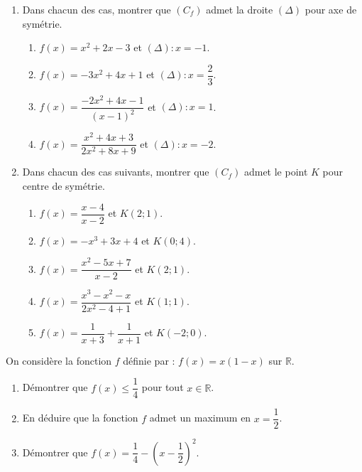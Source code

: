 \documentclass[12pt]{article}
\begin{document}
\begin{enumerate}
    \item  Dans chacun des cas, montrer que \( (C_f) \) admet la droite \( (\Delta) \) pour axe de symétrie.

\begin{enumerate}
    \item \( f(x) = x^2 + 2x - 3 \) et \( (\Delta) : x = -1 \).
    \item \( f(x) = -3x^2 + 4x + 1 \) et \( (\Delta) : x = \dfrac{2}{3} \).
    \item \( f(x) = \dfrac{-2x^2 + 4x - 1}{(x - 1)^2} \) et \( (\Delta) : x = 1 \).
    \item \( f(x) = \dfrac{x^2 + 4x + 3}{2x^2 + 8x + 9} \) et \( (\Delta) : x = -2 \).
\end{enumerate}

\item  Dans chacun des cas suivants, montrer que \( (C_f) \) admet le point \( K \) pour centre de symétrie.

\begin{enumerate}
    \item \( f(x) = \dfrac{x - 4}{x - 2} \) et \( K(2;1) \).
    \item \( f(x) = -x^3 + 3x + 4 \) et \( K(0;4) \).
    \item \( f(x) = \dfrac{x^2 - 5x + 7}{x - 2} \) et \( K(2;1) \).
    \item \( f(x) = \dfrac{x^3 - x^2 - x}{2x^2 - 4 + 1} \) et \( K(1;1) \).
    \item \( f(x) = \dfrac{1}{x+3} + \dfrac{1}{x+1} \) et \( K(-2;0) \).
\end{enumerate}

\end{enumerate}


\bigskip

On considère la fonction \( f \) définie par :  
\( f(x) = x(1 - x) \) sur \( \mathbb{R} \).

\begin{enumerate}
    \item Démontrer que \( f(x) \leq \dfrac{1}{4} \) pour tout \( x \in \mathbb{R} \).
    \item En déduire que la fonction \( f \) admet un maximum en \( x = \dfrac{1}{2} \).
    \item Démontrer que \( f(x) = \dfrac{1}{4} - \left( x - \dfrac{1}{2} \right)^2 \).
\end{enumerate}
\end{document}
